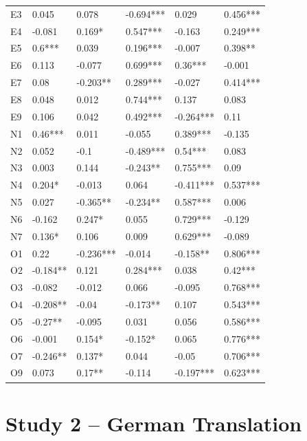\documentclass[floatsintext,man]{apa6}
\theoremstyle{definition}
\theoremstyle{definition}
\theoremstyle{definition}
\theoremstyle{remark}
\begin{document}
\begin{table}[ht]
\begin{tabular}{llllll}
  E3 & 0.045 & 0.078 & -0.694*** & 0.029 & 0.456*** \\ 
  E4 & -0.081 & 0.169* & 0.547*** & -0.163 & 0.249*** \\ 
  E5 & 0.6*** & 0.039 & 0.196*** & -0.007 & 0.398** \\ 
  E6 & 0.113 & -0.077 & 0.699*** & 0.36*** & -0.001 \\ 
  E7 & 0.08 & -0.203** & 0.289*** & -0.027 & 0.414*** \\ 
  E8 & 0.048 & 0.012 & 0.744*** & 0.137 & 0.083 \\ 
  E9 & 0.106 & 0.042 & 0.492*** & -0.264*** & 0.11 \\ 
  N1 & 0.46*** & 0.011 & -0.055 & 0.389*** & -0.135 \\ 
  N2 & 0.052 & -0.1 & -0.489*** & 0.54*** & 0.083 \\ 
  N3 & 0.003 & 0.144 & -0.243** & 0.755*** & 0.09 \\ 
  N4 & 0.204* & -0.013 & 0.064 & -0.411*** & 0.537*** \\ 
  N5 & 0.027 & -0.365** & -0.234** & 0.587*** & 0.006 \\ 
  N6 & -0.162 & 0.247* & 0.055 & 0.729*** & -0.129 \\ 
  N7 & 0.136* & 0.106 & 0.009 & 0.629*** & -0.089 \\ 
  O1 & 0.22 & -0.236*** & -0.014 & -0.158** & 0.806*** \\ 
  O2 & -0.184** & 0.121 & 0.284*** & 0.038 & 0.42*** \\ 
  O3 & -0.082 & -0.012 & 0.066 & -0.095 & 0.768*** \\ 
  O4 & -0.208** & -0.04 & -0.173** & 0.107 & 0.543*** \\ 
  O5 & -0.27** & -0.095 & 0.031 & 0.056 & 0.586*** \\ 
  O6 & -0.001 & 0.154* & -0.152* & 0.065 & 0.776*** \\ 
  O7 & -0.246** & 0.137* & 0.044 & -0.05 & 0.706*** \\ 
  O9 & 0.073 & 0.17** & -0.114 & -0.197*** & 0.623*** \\ 
   \hline
\end{tabular}
\endgroup
\end{table}

\hypertarget{study-2-german-translation}{%
\section{Study 2 -- German
Translation}\label{study-2-german-translation}}
\end{document}
